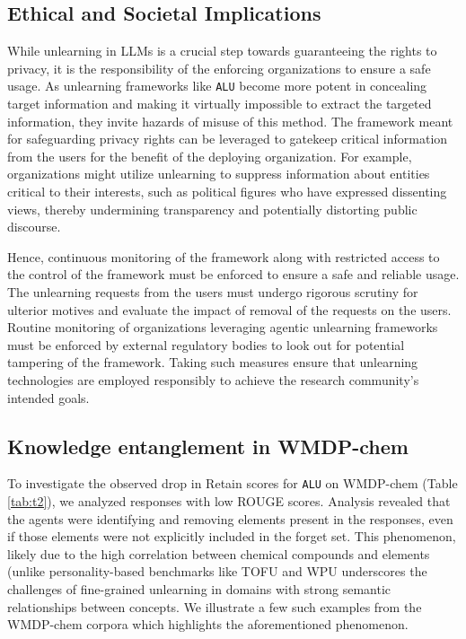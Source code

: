 \subsection{Ethical and Societal Implications}
While unlearning in LLMs is a crucial step towards guaranteeing the rights to privacy, it is the responsibility of the enforcing organizations to ensure a safe usage. As unlearning frameworks like \texttt{ALU} become more potent in concealing target information and making it virtually impossible to extract the targeted information, they invite hazards of misuse of this method. The framework meant for safeguarding privacy rights can be leveraged to gatekeep critical information from the users for the benefit of the deploying  organization. For example, organizations might utilize unlearning to suppress information about entities critical to their interests, such as political figures who have expressed dissenting views, thereby undermining transparency and potentially distorting public discourse.

Hence, continuous monitoring of the framework along with restricted access to the control of the framework must be enforced to ensure a safe and reliable usage. The unlearning requests from the users must undergo rigorous scrutiny for ulterior motives and evaluate the impact of removal of the requests on the users. Routine monitoring of organizations leveraging agentic unlearning frameworks must be enforced by external regulatory bodies to look out for potential tampering of the framework. Taking such measures ensure that unlearning technologies are employed responsibly to achieve the research community's intended goals.

\subsection{Knowledge entanglement in WMDP-chem}
\label{sec:wmdp-chem}
To investigate the observed drop in Retain scores for \texttt{ALU} on WMDP-chem (Table \ref{tab:t2}), we analyzed responses with low ROUGE scores.  Analysis revealed that the agents were identifying and removing elements present in the responses, even if those elements were not explicitly included in the forget set.  This phenomenon, likely due to the high correlation between chemical compounds and elements (unlike personality-based benchmarks like TOFU \cite{maini2024tofu} and WPU \cite{liu2024revisitingwhosharrypotter} underscores the challenges of fine-grained unlearning in domains with strong semantic relationships between concepts. We illustrate a few such examples from the WMDP-chem corpora which highlights the aforementioned phenomenon. 



